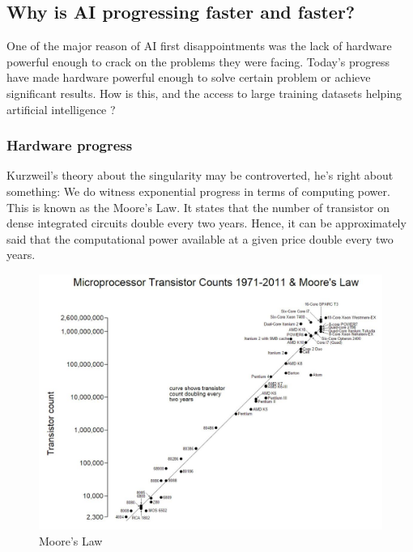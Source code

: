 \documentclass[12pt]{article}
\begin{document}
\pagebreak

\subsection{Why is AI progressing faster and faster?}

One of the major reason of AI first disappointments was the lack of hardware
powerful  enough to crack on the problems they were facing. Today's progress
have made hardware powerful enough to solve certain problem or achieve
significant results. How is this, and the  access to large training datasets
helping artificial intelligence ?

\subsubsection{Hardware progress}

Kurzweil's theory about the singularity may be controverted, he's right about
something: We do witness exponential progress in terms of computing power. This
is known as the Moore's Law. It states that the number of transistor on dense
integrated circuits double every two years. Hence, it can be approximately said
that the computational power available at a given price double every two years.

\begin{figure}[ht]
    \centering
    \includegraphics[width=\textwidth]{moore}
    \caption{Moore's Law}
    \label{fig:moore}
\end{figure}
\end{document}
